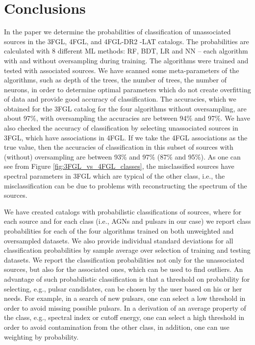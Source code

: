 \section{Conclusions}

In the paper we determine the probabilities of classification of unassociated sources in the 3FGL, 4FGL, and 4FGL-DR2 \Fermi-LAT catalogs.
The probabilities are calculated with 8 different ML methods: RF, BDT, LR and NN -- each algorithm with and without oversampling during training.
The algorithms were trained and tested with associated sources.
We have scanned some meta-parameters of the algorithms, such as depth of the trees, the number of trees, the number of neurons, in order to determine optimal parameters which do not create overfitting of data and provide good accuracy of classification.
The accuracies, which we obtained for the 3FGL catalog for the four algorithms without oversampling, are about 97\%, with oversampling the accuracies are between 94\% and 97\%.
We have also checked the accuracy of classification by selecting unassociated sources in 3FGL, which have associations in 4FGL.
If we take the 4FGL associations as the true value, then the accuracies of classification in this subset of sources 
with (without) oversampling are between 93\% and 97\% (87\% and 95\%).
As one can see from Figure \ref{fig:3FGL_vs_4FGL_classes}, the misclassified sources have spectral parameters in 3FGL which are typical of the other class, i.e., the misclassification can be due to problems with reconstructing the spectrum of the sources.

We have created catalogs with probabilistic classifications of sources, where for each source and for each class (i.e., AGNs and pulsars in our case) we report class probabilities for each of the four algorithms trained on both unweighted and oversampled datasets. 
We also provide individual standard deviations for all classification probabilities by sample average over selection of training and testing datasets.
We report the classification probabilities not only for the unassociated sources, but also for the associated ones, which can be used to find outliers.
An advantage of such probabilistic classification is that a threshold on probability for selecting, e.g., pulsar candidates, can be chosen by the user based on his or her needs.
For example, in a search of new pulsars, one can select a low threshold in order to avoid missing possible pulsars.
In a derivation of an average property of the class, e.g., spectral index or cutoff energy, one can select a high threshold in order to avoid contamination from the other class, in addition, one can use weighting by probability.

